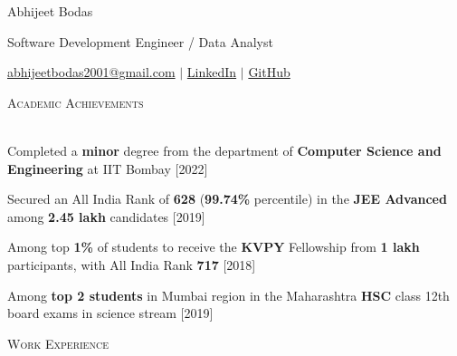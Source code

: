 \documentclass[10pt]{article}
\renewcommand{\section}[1]{
    \vspace*{5pt}
    \textsc{\Large{#1}}
    \vspace*{-8pt} \\ \hspace*{-5pt} 
    \hrulefill \\
    \vspace*{-15pt}
    \vspace*{-5pt}
}
\newcommand{\smallbullet}{
    \small$\bullet$
}
\newenvironment{bullet-list-major}{
    \vspace*{8pt}
    \begin{list}{
        \smallbullet
    }{
        \setlength\leftmargin{15pt}\topsep -5pt \itemsep -6pt
    }
} {
    \end{list}
}
\begin{document}


    {\LARGE{\begin{center}Abhijeet Bodas\end{center}}}
    {\begin{center}Software Development Engineer / Data Analyst\end{center}}
    {\begin{center}
        {\color{blue}\href{mailto:abhijeetbodas2001@gmail.com}{abhijeetbodas2001@gmail.com}} \(|\) {\color{blue}\href{https://www.linkedin.com/in/abhijeetbodas2001/}{LinkedIn}} \(|\) {\color{blue}\href{https://github.com/abhijeetbodas2001/}{GitHub}}
    \end{center}}


    \section{Academic Achievements}
    \begin{bullet-list-major}
        \item Completed a \textbf{minor} degree from the department of \textbf{Computer Science and Engineering} at IIT Bombay \hfill [2022]
        \item Secured an All India Rank of \textbf{628} (\textbf{99.74\%} percentile) in the \textbf{JEE Advanced} among \textbf{2.45 lakh} candidates \hfill [2019]
        \item Among top \textbf{1\%} of students to receive the \textbf{KVPY} Fellowship from \textbf{1 lakh} participants, with All India Rank \textbf{717}  \hfill [2018]
        \item Among \textbf{top 2 students} in Mumbai region in the Maharashtra \textbf{HSC} class 12th board exams in science stream   \hfill [2019]
    \end{bullet-list-major}


    \section{Work Experience}
\end{document}

